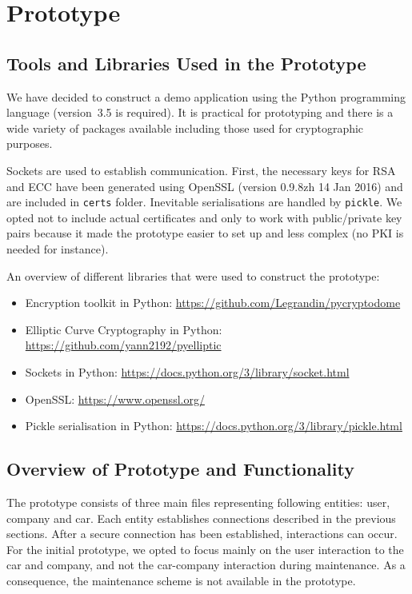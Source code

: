 \section{Prototype}

\subsection{Tools and Libraries Used in the Prototype}

We have decided to construct a demo application using the Python programming language (version~3.5 is required). It is practical for prototyping and there is a wide variety of packages available including those used for cryptographic purposes.

Sockets are used to establish communication. First, the necessary keys for RSA and ECC have been generated using OpenSSL (version 0.9.8zh 14 Jan 2016) and are included in \lstinline{certs} folder. Inevitable serialisations are handled by \lstinline{pickle}. We opted not to include actual certificates and only to work with public/private key pairs because it made the prototype easier to set up and less complex (no PKI is needed for instance).

An overview of different libraries that were used to construct the prototype:
\begin{itemize}
	\item Encryption toolkit in Python: \url{https://github.com/Legrandin/pycryptodome}
	\item Elliptic Curve Cryptography in Python: \url{https://github.com/yann2192/pyelliptic}
	\item Sockets in Python: \url{https://docs.python.org/3/library/socket.html}
	\item OpenSSL: \url{https://www.openssl.org/}
	\item Pickle serialisation in Python: \url{https://docs.python.org/3/library/pickle.html}
\end{itemize}

\subsection{Overview of Prototype and Functionality}

The prototype consists of three main files representing following entities: user, company and car. Each entity establishes connections described in the previous sections. After a secure connection has been established, interactions can occur. For the initial prototype, we opted to focus mainly on the user interaction to the car and company, and not the car-company interaction during maintenance. As a consequence, the maintenance scheme is not available in the prototype.

